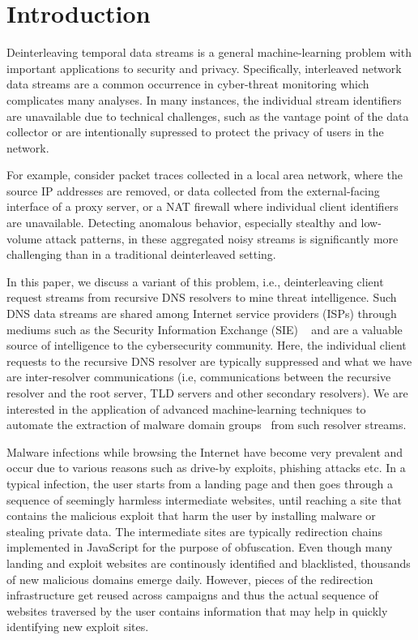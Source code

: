 	\section{Introduction}
	Deinterleaving temporal data streams is a general machine-learning
	problem with important applications to security and privacy.
	Specifically, interleaved network data streams are a common occurrence
	in cyber-threat monitoring which complicates many analyses.  In many
	instances, the individual stream identifiers are unavailable due
	to technical challenges, such as the vantage point of the data
	collector or are intentionally supressed to protect the privacy
	of users in the network.
	
	For example, consider packet traces collected in a local area network,
	where the source IP addresses are removed, or data collected from the
	external-facing interface of a proxy server, or a NAT firewall
	where individual client identifiers are unavailable.  Detecting anomalous
	behavior, especially stealthy and low-volume attack patterns, in
	these aggregated noisy streams is significantly more challenging than
	in a traditional deinterleaved setting.
	
	In this paper, we discuss a variant of this problem, i.e.,
        deinterleaving client request streams from recursive DNS
        resolvers to mine threat intelligence.  Such DNS data streams
        are shared among Internet service providers (ISPs) through
        mediums such as the Security Information Exchange (SIE)
        ~\cite{gao2013empirical} and are a valuable source of
        intelligence to the cybersecurity community.  Here, the
        individual client requests to the recursive DNS resolver are
        typically suppressed and what we have are inter-resolver
        communications (i.e, communications between the recursive
        resolver and the root server, TLD servers and other secondary
        resolvers).  We are interested in the application of advanced
        machine-learning techniques to automate the extraction of
        malware domain groups~\cite{gao2013empirical} from such
        resolver streams.
	
	Malware infections while browsing the Internet have become very
	prevalent and occur due to various reasons such as drive-by exploits,
	phishing attacks etc.  In a typical infection, the user starts from
	a landing page and then goes through a sequence of seemingly harmless
	intermediate websites, until reaching a site that contains the malicious
	exploit that harm the user by installing malware or stealing private
	data.  The intermediate sites are typically redirection chains implemented
	in JavaScript for the purpose of obfuscation.
	Even though many landing and exploit websites are continously identified and
	blacklisted, thousands of new malicious domains emerge daily.  However,
	pieces of the redirection infrastructure get reused across campaigns
	and thus the actual sequence of websites traversed by the user contains
	information that may help in quickly identifying new exploit sites.
	
